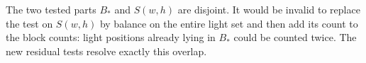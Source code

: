 \begin{remark}
The two tested parts \(B_*\) and \(S(w,h)\) are disjoint.
It would be invalid to replace the test on \(S(w,h)\) by balance on
the entire light set and then add its count to the block counts:
light positions already lying in \(B_*\) could be counted twice.
The new residual tests resolve exactly this overlap.
\end{remark}
